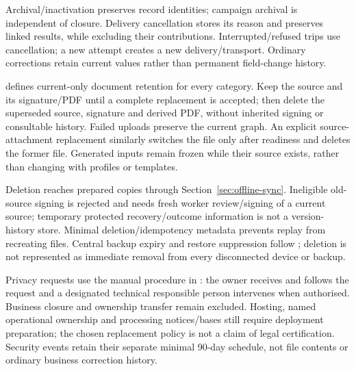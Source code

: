 Archival/inactivation preserves record identities; campaign archival is independent
of closure. Delivery cancellation stores its reason and preserves linked results,
while excluding their contributions. Interrupted/refused trips use cancellation;
a new attempt creates a new delivery/transport. Ordinary corrections retain current
values rather than permanent field-change history.

 defines current-only document retention for every category.
Keep the source and its signature/PDF until a complete replacement is accepted;
then delete the superseded source, signature and derived PDF, without inherited
signing or consultable history. Failed uploads preserve the current graph. An
explicit source-attachment replacement similarly switches the file only after
readiness and deletes the former file. Generated inputs remain frozen while their
source exists, rather than changing with profiles or templates.

Deletion reaches prepared copies through Section~\ref{sec:offline-sync}. Ineligible
old-source signing is rejected and needs fresh worker review/signing of a current
source; temporary protected recovery/outcome information is not a version-history
store. Minimal deletion/idempotency metadata prevents replay from recreating files.
Central backup expiry and restore suppression follow ; deletion
is not represented as immediate removal from every disconnected device or backup.

Privacy requests use the manual procedure in : the owner receives
and follows the request and a designated technical responsible person intervenes
when authorised. Business closure and ownership transfer remain excluded. Hosting,
named operational ownership and processing notices/bases still require deployment
preparation; the chosen replacement policy is not a claim of legal certification.
Security events retain their separate minimal 90-day schedule, not file contents
or ordinary business correction history.
